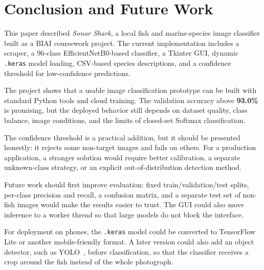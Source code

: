 \documentclass[11pt,a4paper,oneside]{article}
\begin{document}
\section{Conclusion and Future Work}
\label{sec:conclusion}

This paper described \textit{Sonar Shark}, a local fish and marine-species image classifier built as a BIAI coursework project. The current implementation includes a scraper, a 96-class EfficientNetB0-based classifier, a Tkinter GUI, dynamic \texttt{.keras} model loading, CSV-based species descriptions, and a confidence threshold for low-confidence predictions.

The project shows that a usable image classification prototype can be built with standard Python tools and cloud training. The validation accuracy above \textbf{93.0\%} is promising, but the deployed behavior still depends on dataset quality, class balance, image conditions, and the limits of closed-set Softmax classification.

The confidence threshold is a practical addition, but it should be presented honestly: it rejects some non-target images and fails on others. For a production application, a stronger solution would require better calibration, a separate unknown-class strategy, or an explicit out-of-distribution detection method.

Future work should first improve evaluation: fixed train/validation/test splits, per-class precision and recall, a confusion matrix, and a separate test set of non-fish images would make the results easier to trust. The GUI could also move inference to a worker thread so that large models do not block the interface.

For deployment on phones, the \texttt{.keras} model could be converted to TensorFlow Lite or another mobile-friendly format. A later version could also add an object detector, such as YOLO~\cite{yolo}, before classification, so that the classifier receives a crop around the fish instead of the whole photograph.
\end{document}

